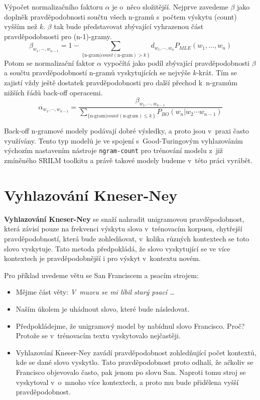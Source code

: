 \documentclass[12pt,a4paper]{report}
\begin{document}
Výpočet normalizačního faktoru $\alpha$ je o~něco složitější. Nejprve zavedeme $\beta$ jako doplněk pravděpodobnosti součtu všech n-gramů s~počtem výskytu (count) vyšším než $k$. $\beta$ tak bude představovat zbývající vyhrazenou část pravděpodobnosti pro (n-1)-gramy.
\begin{equation}
\beta_{w_{1}, \cdots, w_{n-1}} = 1 - \sum_{ \{\text{n-gram} | count(\text{n-gram}) > k~\} } d_{w_{1}, \cdots, w_{n}} P_{MLE}(w_1, \ldots, w_n)
\end{equation}
Potom se normalizační faktor $\alpha$ vypočítá jako podíl zbývající pravděpodobnosti $\beta$ a součtu pravděpodobností n-gramů vyskytujících se nejvýše $k$-krát. Tím se zajistí vždy ještě dostatek pravděpodobnosti pro další přechod k~n-gramům nižších řádů back-off operacemi.
\begin{equation}
\alpha_{w_{1}, \cdots, w_{n -1}} = \frac{\beta_{w_{1}, \cdots, w_{n -1}}}        {\sum_{ \{ \text{n-gram} | count(\text{n-gram}) \leq k~\} } P_{BO}(w_n | w_{2} \cdots w_{n-1})}
\end{equation}

Back-off n-gramové modely podávají dobré výsledky, a proto jsou v~praxi často využívány. Tento typ modelů je ve spojení s~Good-Turingovým vyhlazováním výchozím nastavením nástroje \texttt{ngram-count} pro trénování modelu z~již zmíněného SRILM toolkitu a právě takové modely budeme v~této práci vyrábět.

\section{Vyhlazování Kneser-Ney}
\textbf{Vyhlazování Kneser-Ney} se snaží nahradit unigramovou pravděpodobnost, která závisí pouze na frekvenci výskytu slova v~trénovacím korpusu, chytřejší pravděpodobností, která bude zohledňovat, v~kolika různých kontextech se toto slovo vyskytuje. Tato metoda předpokládá, že slovo vyskytující se ve více kontextech je pravděpodobnější i pro výskyt v~kontextu novém.

Pro příklad uvedeme větu se San Franciscem a psacím strojem:
\begin{itemize}
\item{Mějme část věty: \textit{V~muzeu se mi líbil starý psací \ldots}}
\item{Naším úkolem je uhádnout slovo, které bude následovat.}
\item{Předpokládejme, že unigramový model by nabídnul slovo Francisco. Proč? Protože se v~trénovacím textu vyskytovalo nejčastěji.}
\item{Vyhlazování Kneser-Ney zavádí pravděpodobnost zohledňující počet kontextů, kde se dané slovo vyskytlo. Tato pravděpodobnost proto odhalí, že ačkoliv se Francisco objevovalo často, pak jenom po slovu San. Naproti tomu stroj se vyskytoval v~o~mnoho více kontextech, a proto mu bude přidělena vyšší pravděpodobnost.}
\end{itemize}
\end{document}
